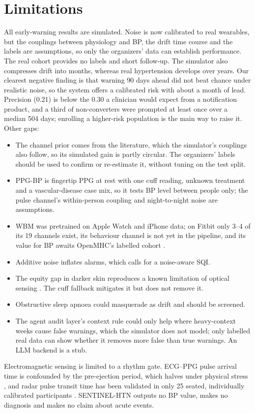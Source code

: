 \documentclass[conference]{IEEEtran}
\begin{document}
\section{Limitations}
All early-warning results are simulated. Noise is now calibrated to real wearables, but the couplings between physiology and BP, the drift time course and the labels are assumptions, so only the organizers' data can establish performance. The real cohort provides no labels and short follow-up. The simulator also compresses drift into months, whereas real hypertension develops over years. Our clearest negative finding is that warning 90 days ahead did not beat chance under realistic noise, so the system offers a calibrated risk with about a month of lead. Precision (0.21) is below the 0.30 a clinician would expect from a notification product, and a third of non-converters were prompted at least once over a median 504 days; enrolling a higher-risk population is the main way to raise it. Other gaps:
\begin{itemize}
\item The channel prior comes from the literature, which the simulator's couplings also follow, so its simulated gain is partly circular. The organizers' labels should be used to confirm or re-estimate it, without tuning on the test split.
\item PPG-BP is fingertip PPG at rest with one cuff reading, unknown treatment and a vascular-disease case mix, so it tests BP level between people only; the pulse channel's within-person coupling and night-to-night noise are assumptions.
\item WBM was pretrained on Apple Watch and iPhone data; on Fitbit only 3--4 of its 19 channels exist, its behaviour channel is not yet in the pipeline, and its value for BP awaits OpenMHC's labelled cohort \cite{openmhc2026}.
\item Additive noise inflates alarms, which calls for a noise-aware SQI.
\item The equity gap in darker skin reproduces a known limitation of optical sensing \cite{mulholland2025}. The cuff fallback mitigates it but does not remove it.
\item Obstructive sleep apnoea could masquerade as drift and should be screened.
\item The agent audit layer's context rule could only help where heavy-context weeks cause false warnings, which the simulator does not model; only labelled real data can show whether it removes more false than true warnings. An LLM backend is a stub.
\end{itemize}
Electromagnetic sensing is limited to a rhythm gate. ECG--PPG pulse arrival time is confounded by the pre-ejection period, which halves under physical stress \cite{pilz2023}, and radar pulse transit time has been validated in only 25 seated, individually calibrated participants \cite{zhu2026}. SENTINEL-HTN outputs no BP value, makes no diagnosis and makes no claim about acute events.
\end{document}
